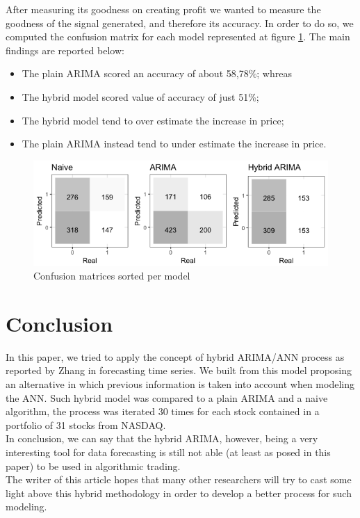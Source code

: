 \documentclass[twocolumn]{article}
\begin{document}
After measuring its goodness on creating profit we wanted to measure the goodness of the signal generated, and therefore its accuracy. In order to do so, we computed the confusion matrix for each model represented at figure \ref{confusionmatrix}. The main findings are reported below:
\begin{itemize}
    \item The plain ARIMA scored an accuracy of about 58,78\%; whreas
    \item The hybrid model scored value of accuracy of just 51\%;
    \item The hybrid model tend to over estimate the increase in price;
    \item The plain ARIMA instead tend to under estimate the increase in price.
\end{itemize}

\begin{figure}
    \centering
    \includegraphics[width=1\linewidth, ]{Paper/images/Confusion_matrix.png}
    \caption{Confusion matrices sorted per model}
    \label{confusionmatrix}
\end{figure}

\section{Conclusion}
In this paper, we tried to apply the concept of hybrid ARIMA/ANN process as reported by Zhang in forecasting time series. We built from this model proposing an alternative in which previous information is taken into account when modeling the ANN. Such hybrid model was compared to a plain ARIMA and a naive algorithm, the process was iterated 30 times for each stock contained in a portfolio of 31 stocks from NASDAQ.
\\ 
In conclusion, we can say that the hybrid ARIMA, however, being a very interesting tool for data forecasting is still not able (at least as posed in this paper) to be used in algorithmic trading. 
\\
The writer of this article hopes that many other researchers will try to cast some light above this hybrid methodology in order to develop a better process for such modeling.
\end{document}
